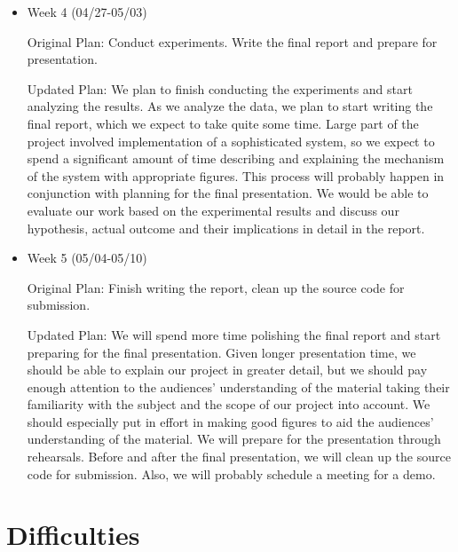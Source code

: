\documentclass[11pt]{article}
\begin{document}
\begin{itemize}
  \item Week 4 (04/27-05/03)

Original Plan: Conduct experiments. Write the final report and prepare for presentation.

Updated Plan: We plan to finish conducting the experiments and start analyzing the results. As we analyze the data, we plan to start writing the final report, which we expect to take quite some time. Large part of the project involved implementation of a sophisticated system, so we expect to spend a significant amount of time describing and explaining the mechanism of the system with appropriate figures. This process will probably happen in conjunction with planning for the final presentation. We would be able to evaluate our work based on the experimental results and discuss our hypothesis, actual outcome and their implications in detail in the report.

  \item Week 5 (05/04-05/10)

Original Plan: Finish writing the report, clean up the source code for submission.

Updated Plan: We will spend more time polishing the final report and start preparing for the final presentation. Given longer presentation time, we should be able to explain our project in greater detail, but we should pay enough attention to the audiences’ understanding of the material taking their familiarity with the subject and the scope of our project into account. We should especially put in effort in making good figures to aid the audiences’ understanding of the material. We will prepare for the presentation through rehearsals. Before and after the final presentation, we will clean up the source code for submission. Also, we will probably schedule a meeting for a demo.

\end{itemize}

\section {Difficulties}
\end{document}
